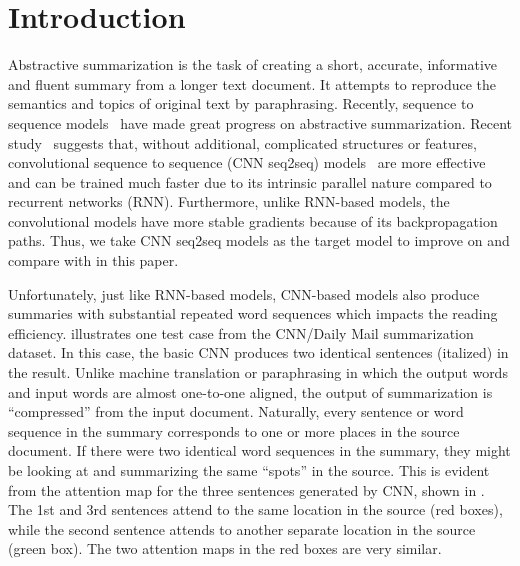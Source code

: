 \section{Introduction}
\label{sec:intro}

Abstractive summarization is the task of creating a short, accurate,
informative and fluent summary from a longer text document.
It attempts to reproduce the semantics and topics of original text
by paraphrasing. 
Recently, sequence to sequence
models~\cite{RushCW15,ChopraAR16,NallapatiZSGX16,SeeLM17,PaulusXS17}
have made great progress on abstractive summarization.
Recent study~\cite{bai2018empirical} suggests that, 
without additional, complicated structures or features,
convolutional sequence to sequence 
(CNN seq2seq) models~\cite{gehring2017convs2s,FanGA18,LiuLZ18} 
are more effective and can be trained much faster due to 
its intrinsic parallel nature compared to recurrent networks (RNN).
Furthermore, unlike RNN-based models, 
the convolutional models have more stable gradients 
because of its backpropagation paths. 
Thus, we take CNN seq2seq models as the target model to improve on and
compare with
in this paper.

Unfortunately, just like RNN-based models, CNN-based models also produce
summaries with substantial repeated word sequences which impacts the reading efficiency.
 illustrates one 
test case from the CNN/Daily Mail summarization dataset. 
In this case, the basic CNN produces two 
identical sentences (italized) in the result. 
Unlike machine translation or paraphrasing in which the output words
and input words are almost one-to-one aligned, the output of summarization
is ``compressed'' from the input document. Naturally, every sentence or 
word sequence in the summary corresponds to one or more places in the source
document. If there were two identical word sequences in the summary,
they might be looking at and summarizing the same ``spots'' in the source.
This is evident from the attention map for the three sentences generated by 
CNN, shown in . The 1st and 3rd sentences attend to
the same location in the source (red boxes), while the second
sentence attends to another separate location in the source (green box). 
The two attention maps in the red boxes are very similar.

